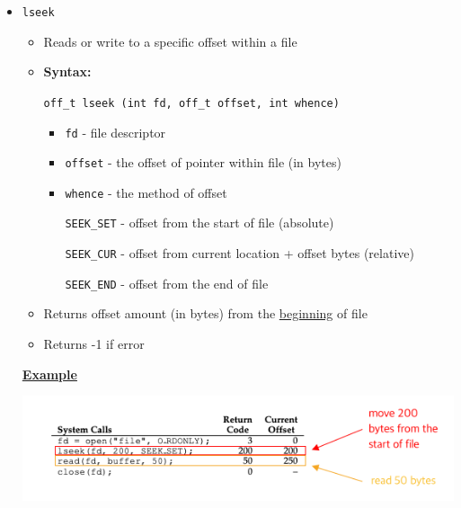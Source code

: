 \documentclass[12pt]{article}
\begin{document}
\begin{enumerate}[1.]
\begin{enumerate}
\begin{itemize}
\begin{itemize}
                \item \texttt{lseek}

                \begin{itemize}
                    \item Reads or write to a specific offset within a file
                    \item \textbf{Syntax:}

                    \bigskip

                    \texttt{off\_t lseek (int fd, off\_t offset, int whence)}

                    \bigskip

                    \begin{itemize}
                        \item \texttt{fd} - file descriptor
                        \item \texttt{offset} - the offset of pointer within file (in bytes)
                        \item \texttt{whence} - the method of offset

                        \bigskip

                        \quad \texttt{SEEK\_SET}  - offset from the start of file (absolute)

                        \quad \texttt{SEEK\_CUR} - offset from current location + offset bytes (relative)

                        \quad \texttt{SEEK\_END} - offset from the end of file
                    \end{itemize}

                    \item Returns offset amount (in bytes) from the \underline{beginning} of file
                    \item Returns -1 if error
                \end{itemize}

                \bigskip

                \underline{\textbf{Example}}

                \begin{center}
                \includegraphics[width=\linewidth]{../images/midterm_4_solution_7.png}
                \end{center}


\end{itemize}
\end{itemize}
\end{enumerate}
\end{enumerate}
\end{document}
